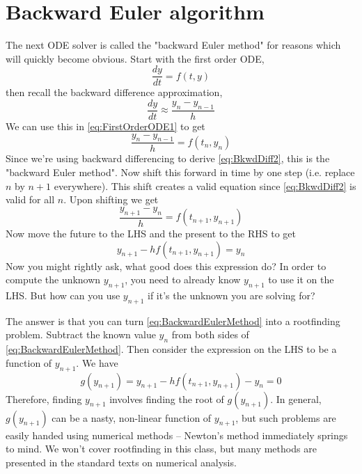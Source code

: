 \documentclass[hidelinks,notitlepage]{book}
\begin{document}
\section{Backward Euler algorithm}
The next ODE solver is called the "backward Euler method" for reasons which will quickly become obvious.  Start with the first order ODE,
\begin{equation}
\label{eq:FirstOrderODE1}
\frac{d y}{d t} = f(t, y) 
\end{equation}
then recall the backward difference approximation,
\begin{equation}
\nonumber
\frac{d y}{d t} \approx \frac{y_n - y_{n-1}}{h}
\end{equation}
We can use this in \cref{eq:FirstOrderODE1} to get
\begin{equation}
\label{eq:BkwdDiff2}
\frac{y_n - y_{n-1}}{h} = f(t_n, y_n) 
\end{equation}
Since we're using backward differencing to derive \cref{eq:BkwdDiff2}, this is the "backward Euler method".   Now shift this forward in time by one step (i.e. replace $n$ by $n+1$ everywhere).  This shift creates a valid equation since \cref{eq:BkwdDiff2} is valid for all $n$.  Upon shifting we get
\begin{equation}
\nonumber
\frac{y_{n+1} - y_{n}}{h} = f(t_{n+1}, y_{n+1}) 
\end{equation}
Now move the future to the LHS and the present to the RHS to get
\begin{equation}
\label{eq:BackwardEulerMethod}
y_{n+1} - h f(t_{n+1}, y_{n+1}) = y_{n}
\end{equation}
Now you might rightly ask, what good does this expression do?  In order to compute the unknown $y_{n+1}$, you need to already know $y_{n+1}$ to use it on the LHS.  But how can you use $y_{n+1}$ if it's the unknown you are solving for?

The answer is that you can turn \cref{eq:BackwardEulerMethod} into a rootfinding problem.  Subtract the known value $y_n$ from both sides of \cref{eq:BackwardEulerMethod}.  Then consider the expression on the LHS to be a function of $y_{n+1}$.  We have
\begin{equation}
\label{eq:BackwardEulerRootfinding}
g(y_{n+1}) =
y_{n+1} - h f(t_{n+1}, y_{n+1}) - y_{n}
= 0
\end{equation}
Therefore, finding $y_{n+1}$ involves finding the root of $g(y_{n+1})$.  In general, $g(y_{n+1})$ can be a nasty, non-linear function of $y_{n+1}$, but such problems are easily handed using numerical methods -- Newton's method immediately springs to mind.  We won't cover rootfinding in this class, but many methods are presented in the standard texts on numerical analysis.
\end{document}

